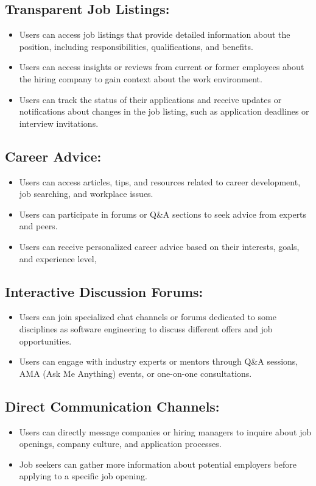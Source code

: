 \documentclass[titlepage]{article}
\begin{document}
\subsection{Transparent Job Listings:}
\begin{itemize}
    \item Users can access job listings that provide detailed information about the position, including responsibilities, qualifications, and benefits.
    \item Users can access insights or reviews from current or former employees about the hiring company to gain context about the work environment.
    \item Users can track the status of their applications and receive updates or notifications about changes in the job listing, such as application deadlines or interview invitations.
\end{itemize}

\subsection{Career Advice:}
\begin{itemize}
    \item Users can access articles, tips, and resources related to career development, job searching, and workplace issues.
    \item Users can participate in forums or Q\&A sections to seek advice from experts and peers.
    \item Users can receive personalized career advice based on their interests, goals, and experience level,
\end{itemize}

\subsection{Interactive Discussion Forums:}
\begin{itemize}
    \item Users can join specialized chat channels or forums dedicated to some disciplines as software engineering to discuss different offers and job opportunities.
    \item Users can engage with industry experts or mentors through Q\&A sessions, AMA (Ask Me Anything) events, or one-on-one consultations.
\end{itemize}

\subsection{Direct Communication Channels:}
\begin{itemize}
    \item Users can directly message companies or hiring managers to inquire about job openings, company culture, and application processes.
    \item Job seekers can gather more information about potential employers before applying to a specific job opening.
\end{itemize}
\end{document}
